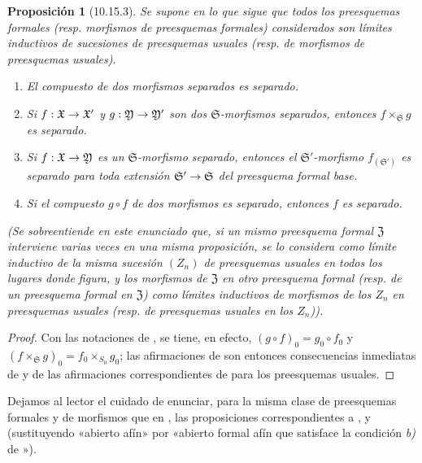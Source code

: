 \documentclass[oneside]{amsart}
\theoremstyle{ega-env-style}
\theoremstyle{ega-thm-env-style}
\newtheorem*{proposition}{Proposición}
\theoremstyle{ega-defn-env-style}
\renewcommand{\to}{\mathchoice{\longrightarrow}{\rightarrow}{\rightarrow}{\rightarrow}}
\newcommand{\oldpage}[2][]{{\marginnote{\normalfont{\textbf{#1}~|~#2}}}\ignorespaces}
\let\EGAOriginalLabel\label
\renewcommand{\label}[1]{\phantomsection\EGAOriginalLabel{#1}}
\begin{document}
\begin{proposition}[10.15.3]
\label{I.10.15.3}
Se supone en lo que sigue que todos los preesquemas formales \textup{(resp.} morfismos de preesquemas formales) considerados son límites inductivos de sucesiones de preesquemas usuales \textup{(resp.} de morfismos de preesquemas usuales).
\begin{enumerate}
    \item[\rm{(i)}] El compuesto de dos morfismos separados es separado.
    \item[\rm{(ii)}] Si $f:\mathfrak{X}\to\mathfrak{X}'$ y $g:\mathfrak{Y}\to\mathfrak{Y}'$ son dos $\mathfrak{S}$-morfismos separados, entonces $f\times_{\mathfrak{S}}g$ es separado.
    \item[\rm{(iii)}] Si $f:\mathfrak{X}\to\mathfrak{Y}$ es un $\mathfrak{S}$-morfismo separado, entonces el $\mathfrak{S}'$-morfismo $f_{(\mathfrak{S}')}$ es separado para toda extensión $\mathfrak{S}'\to\mathfrak{S}$ del preesquema formal base.
    \item[\rm{(iv)}] Si el compuesto $g\circ f$ de dos morfismos es separado, entonces $f$ es separado.
\end{enumerate}
\emph{(Se sobreentiende en este enunciado que, si un mismo preesquema formal $\mathfrak{Z}$ interviene varias veces en una misma proposición, se lo considera como límite inductivo de la \emph{misma} sucesión $(Z_n)$ de preesquemas usuales en todos los lugares donde figura, y los morfismos de $\mathfrak{Z}$ en otro preesquema formal (resp. de un preesquema formal en $\mathfrak{Z}$) como límites inductivos de morfismos de los $Z_n$ en preesquemas usuales (resp. de preesquemas usuales en los $Z_n$)).}
\end{proposition}

\begin{proof}
Con las notaciones de , se tiene, en efecto, $(g\circ f)_0=g_0\circ f_0$ y $(f\times_{\mathfrak{S}}g)_0=f_0\times_{S_0}g_0$;
las afirmaciones de  son entonces consecuencias inmediatas de  y de las afirmaciones correspondientes de  para los preesquemas usuales.
\end{proof}

Dejamos al lector el cuidado de enunciar, para la misma clase de preesquemas formales y de morfismos que en , las proposiciones correspondientes a ,
\oldpage[I]{213}
 y  (sustituyendo «abierto afín» por «abierto formal afín que satisface la condición \emph{b)} de »).
\end{document}
